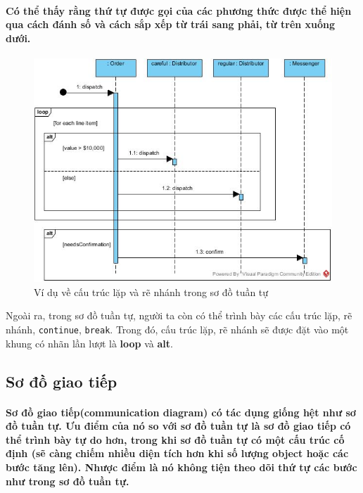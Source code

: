 \documentclass{article}
\begin{document}
  \paragraph{\textnormal{Có thể thấy rằng thứ tự được gọi của các phương thức được thể hiện qua cách đánh số và cách sắp xếp từ trái sang phải, từ trên xuống dưới.
  }}

  \begin{figure}[!ht]
    \centering
    \includegraphics[scale=0.5]{../pictures/diagrams/sequence/sequence-diagram-2.jpg}
    \caption{Ví dụ về cấu trúc lặp và rẽ nhánh trong sơ đồ tuần tự}
  \end{figure}

  Ngoài ra, trong sơ đồ tuần tự, người ta còn có thể trình bày các cấu trúc lặp, rẽ nhánh, \texttt{continue}, \texttt{break}. Trong đó, cấu trúc lặp, rẽ nhánh sẽ được đặt vào một khung có nhãn lần lượt là \textbf{loop} và \textbf{alt}.

  \subsection{Sơ đồ giao tiếp}

  \paragraph{\textnormal{Sơ đồ giao tiếp(communication diagram) có tác dụng giống hệt như sơ đồ tuần tự. Ưu điểm của nó so với sơ đồ tuần tự là sơ đồ giao tiếp có thể trình bày tự do hơn, trong khi sơ đồ tuần tự có một cấu trúc cố định (sẽ càng chiếm nhiều diện tích hơn khi số lượng object hoặc các bước tăng lên). Nhược điểm là nó không tiện theo dõi thứ tự các bước như trong sơ đồ tuần tự.}}
\end{document}
